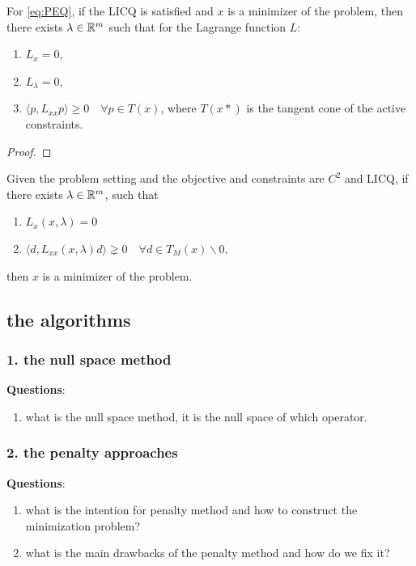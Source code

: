 \begin{theorem}
For \eqref{eq:PEQ}, if the LICQ is satisfied and $x$ is a minimizer of the problem, then there exists $\lambda \in \mathbb{R}^m$ such that for the Lagrange function $L$:
\begin{enumerate}
	\item $ L_x = 0 $,
	\item $ L_\lambda = 0 $,
	\item $ \langle p , L_{xx} p \rangle \ge 0 \quad \forall p \in T(x) $, where $T(x*)$ is the tangent cone of the active constraints. 
\end{enumerate}
\end{theorem}
\begin{proof}
\end{proof}

\begin{theorem}
	Given the problem setting and the objective and constraints are $C^2$ and LICQ, if there exists $\lambda \in \mathbb{R}^m$, such that
	\begin{enumerate}
		\item $L_x ( x, \lambda) = 0 $
		\item $\langle d, L_{xx}(x, \lambda) d \rangle \gneq 0 \quad \forall d \in T_M(x) \backslash 0,$
	\end{enumerate}
	then $x$ is a minimizer of the problem. 
	
\end{theorem}


\subsection{the algorithms}
\subsubsection{1. the null space method}
\textbf{Questions}: 
\begin{enumerate}
	\item what is the null space method, it is the null space of which operator. 
\end{enumerate}


\subsubsection{2. the penalty approaches}
\textbf{Questions}:
\begin{enumerate}
	\item what is the intention for penalty method and how to construct the minimization problem?
	\item what is the main drawbacks of the penalty method and how do we fix it?
\end{enumerate}


